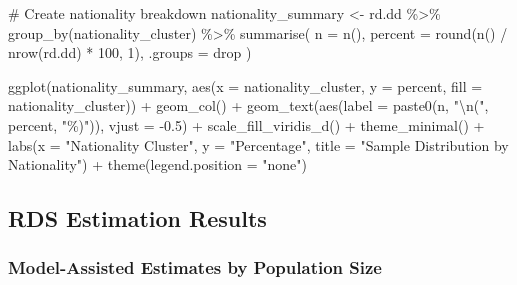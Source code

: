 \documentclass[
  12pt,
]{article}
\newenvironment{Shaded}{\begin{snugshade}}{\end{snugshade}}
\newcommand{\AttributeTok}[1]{\textcolor[rgb]{0.40,0.45,0.13}{#1}}
\newcommand{\CommentTok}[1]{\textcolor[rgb]{0.37,0.37,0.37}{#1}}
\newcommand{\DecValTok}[1]{\textcolor[rgb]{0.68,0.00,0.00}{#1}}
\newcommand{\FloatTok}[1]{\textcolor[rgb]{0.68,0.00,0.00}{#1}}
\newcommand{\FunctionTok}[1]{\textcolor[rgb]{0.28,0.35,0.67}{#1}}
\newcommand{\NormalTok}[1]{\textcolor[rgb]{0.00,0.23,0.31}{#1}}
\newcommand{\OtherTok}[1]{\textcolor[rgb]{0.00,0.23,0.31}{#1}}
\newcommand{\SpecialCharTok}[1]{\textcolor[rgb]{0.37,0.37,0.37}{#1}}
\newcommand{\StringTok}[1]{\textcolor[rgb]{0.13,0.47,0.30}{#1}}
\theoremstyle{plain}
\theoremstyle{definition}
\begin{document}
\begin{Shaded}
\begin{Highlighting}[]
\CommentTok{\# Create nationality breakdown}
\NormalTok{nationality\_summary }\OtherTok{\textless{}{-}}\NormalTok{ rd.dd }\SpecialCharTok{\%\textgreater{}\%}
  \FunctionTok{group\_by}\NormalTok{(nationality\_cluster) }\SpecialCharTok{\%\textgreater{}\%}
  \FunctionTok{summarise}\NormalTok{(}
    \AttributeTok{n =} \FunctionTok{n}\NormalTok{(),}
    \AttributeTok{percent =} \FunctionTok{round}\NormalTok{(}\FunctionTok{n}\NormalTok{() }\SpecialCharTok{/} \FunctionTok{nrow}\NormalTok{(rd.dd) }\SpecialCharTok{*} \DecValTok{100}\NormalTok{, }\DecValTok{1}\NormalTok{),}
    \AttributeTok{.groups =} \StringTok{\textquotesingle{}drop\textquotesingle{}}
\NormalTok{  )}

\FunctionTok{ggplot}\NormalTok{(nationality\_summary, }\FunctionTok{aes}\NormalTok{(}\AttributeTok{x =}\NormalTok{ nationality\_cluster, }\AttributeTok{y =}\NormalTok{ percent, }\AttributeTok{fill =}\NormalTok{ nationality\_cluster)) }\SpecialCharTok{+}
  \FunctionTok{geom\_col}\NormalTok{() }\SpecialCharTok{+}
  \FunctionTok{geom\_text}\NormalTok{(}\FunctionTok{aes}\NormalTok{(}\AttributeTok{label =} \FunctionTok{paste0}\NormalTok{(n, }\StringTok{"}\SpecialCharTok{\textbackslash{}n}\StringTok{("}\NormalTok{, percent, }\StringTok{"\%)"}\NormalTok{)), }\AttributeTok{vjust =} \SpecialCharTok{{-}}\FloatTok{0.5}\NormalTok{) }\SpecialCharTok{+}
  \FunctionTok{scale\_fill\_viridis\_d}\NormalTok{() }\SpecialCharTok{+}
  \FunctionTok{theme\_minimal}\NormalTok{() }\SpecialCharTok{+}
  \FunctionTok{labs}\NormalTok{(}\AttributeTok{x =} \StringTok{"Nationality Cluster"}\NormalTok{, }\AttributeTok{y =} \StringTok{"Percentage"}\NormalTok{, }
       \AttributeTok{title =} \StringTok{"Sample Distribution by Nationality"}\NormalTok{) }\SpecialCharTok{+}
  \FunctionTok{theme}\NormalTok{(}\AttributeTok{legend.position =} \StringTok{"none"}\NormalTok{)}
\end{Highlighting}
\end{Shaded}

\subsection{RDS Estimation Results}\label{rds-estimation-results}

\subsubsection{Model-Assisted Estimates by Population
Size}\label{model-assisted-estimates-by-population-size}
\end{document}
